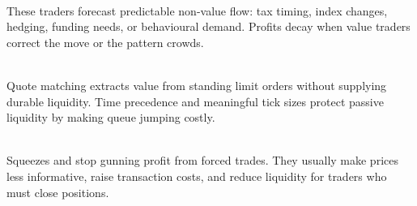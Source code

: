 \begin{mechanism} \\
These traders forecast predictable non-value flow: tax timing, index changes, hedging, funding needs, or behavioural demand. Profits decay when value traders correct the move or the pattern crowds.
\end{mechanism}

\begin{caveat} \\
Quote matching extracts value from standing limit orders without supplying durable liquidity. Time precedence and meaningful tick sizes protect passive liquidity by making queue jumping costly.
\end{caveat}

\begin{caveat} \\
Squeezes and stop gunning profit from forced trades. They usually make prices less informative, raise transaction costs, and reduce liquidity for traders who must close positions.
\end{caveat}
